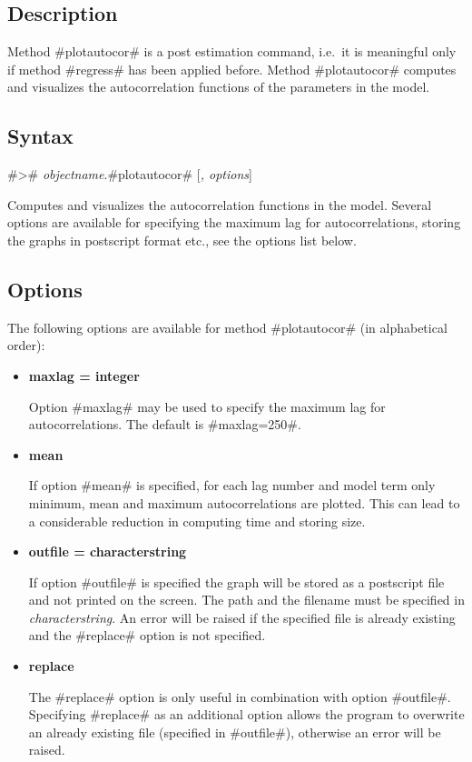 \subsection*{Description}

Method #plotautocor# is a post estimation command, i.e.~it is
meaningful only if method #regress# has been applied before.
Method #plotautocor# computes and visualizes the autocorrelation
functions of the parameters in the model.

\subsection*{Syntax}

#># {\em objectname}.#plotautocor# [{\em , options}]

Computes and visualizes the autocorrelation functions in the
model. Several options are available for specifying the maximum
lag for autocorrelations, storing the graphs in postscript format
etc., see the options list below.

\subsection*{Options}

The following options are available for method #plotautocor# (in
alphabetical order):

\begin{itemize}
\item {\bf maxlag = integer}

Option #maxlag# may be used to specify the maximum lag for
autocorrelations. The default is #maxlag=250#.
\item {\bf mean}

If option #mean# is specified, for each lag number and model term
only minimum, mean and maximum autocorrelations are plotted. This
can lead to a considerable reduction in computing time and storing
size.

\newpage

\item {\bf outfile = characterstring}

If option #outfile# is specified the graph will be stored as a
postscript file and not printed on the screen. The path and the
filename must be specified in {\em characterstring}. An error will
be raised if the specified file is already existing and the
#replace# option is not specified.
\item {\bf replace}

The #replace# option is only useful in combination with option
#outfile#. Specifying #replace# as an additional option allows the
program to overwrite an already existing file (specified in
#outfile#), otherwise an error will be raised.
\end{itemize}

